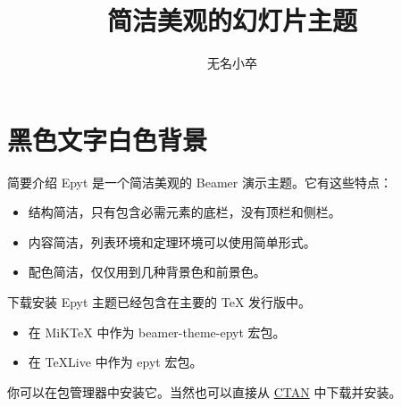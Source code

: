 \documentclass[14pt,notheorems,xcolor={rgb}]{beamer}
\newcommand{\mylead}[1]{\textcolor{acolor1}{#1}}
\newcommand{\mybold}[1]{\textcolor{acolor2}{#1}}
\newcommand{\mywarn}[1]{\textcolor{acolor3}{#1}}
\begin{document}
\title{简洁美观的幻灯片主题}
\author{无名小卒}

\begin{frame}[plain]\transboxout
\titlepage
\end{frame}


\section{黑色文字白色背景}

\begin{frame}{简要介绍}
\mylead{Epyt} 是一个简洁美观的 Beamer 演示主题。它有这些特点：\pause
\begin{itemize}[<+->]
\item 结构简洁，只有包含必需元素的底栏，没有顶栏和侧栏。
\item 内容简洁，列表环境和定理环境可以使用简单形式。
\item 配色简洁，仅仅用到几种背景色和前景色。
\end{itemize}
\end{frame}

\begin{frame}{下载安装}
\mylead{Epyt} 主题已经包含在主要的 TeX 发行版中。
\begin{itemize}
  \item 在 MiKTeX 中作为 \mybold{beamer-theme-epyt} 宏包。
  \item 在 TeXLive 中作为 \mybold{epyt} 宏包。
\end{itemize}
你可以在包管理器中安装它。当然也可以直接从
\href{https://www.ctan.org/pkg/epyt}{CTAN} 中下载并安装。
\end{frame}

\end{document}
